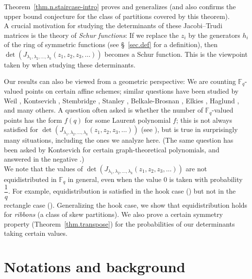 \documentclass[numbers=enddot,12pt,final,onecolumn,notitlepage]{scrartcl}%
\theoremstyle{definition}
\newcommand{\tup}[1]{\left( #1 \right)}
\newcommand{\Fq}{\mathbb{F}_q}
\theoremstyle{plainsl}
\begin{document}
Theorem~\ref{thm.n.staircase-intro} proves and generalizes \cite[Conjecture 10.1]{Anzis18} (and also confirms the upper bound conjecture \cite[Conjecture 5.10]{Anzis18} for the class of partitions covered by this theorem).
\\

A crucial motivation for studying the determinants of these Jacobi--Trudi matrices
is the theory of \emph{Schur functions}:
If we replace the $z_{i}$ by the generators $h_{i}$ of the
ring of symmetric functions (see \S~\ref{sec.def} for a definition), then
$\det\tup{J_{\lambda_1, \lambda_2, \ldots, \lambda_k}\tup{z_1, z_2, z_3, \ldots}}$
becomes a Schur function.
This is the viewpoint taken by \cite{Anzis18} when studying these determinants.

Our results can also be viewed from a geometric perspective:
We are counting $\Fq$-valued points on certain affine schemes;
similar questions have been studied by Weil \cite{Weil}, Kontsevich \cite{Kontsevich}, Stembridge \cite{Stembridge}, Stanley \cite{RPStan}, Belkale-Brosnan \cite{Belkale2003}, Elkies \cite{Elkies}, Haglund \cite{Haglund}, and many others.
A question often asked is whether the number of $\Fq$-valued points has the form $f\tup{q}$ for some Laurent polynomial $f$; this is not always satisfied for $\det\tup{J_{\lambda_1, \lambda_2, \ldots, \lambda_k}\tup{z_1, z_2, z_3, \ldots}}$ (see \cite[Proposition 5.7]{Anzis18}), but is true in surprisingly many situations, including the ones we analyze here. (The same question has been asked by Kontsevich for certain graph-theoretical polynomials, and answered in the negative \cite{Belkale2003}.)
\\

We note that the values of $\det\tup{ J_{\lambda_1, \lambda_2, \ldots, \lambda_k}\tup{z_1, z_2, z_3, \ldots} }$ are not equidistributed in $\Fq$ in general, even when the value $0$ is taken with probability $\dfrac{1}{q}$. For example, equidistribution is satisfied in the hook case (\cite[Proposition 1.2]{Anzis18}) but not in the rectangle case (\cite[Lemma 9.3]{Anzis18}). Generalizing the hook case, we show that equidistribution holds for \emph{ribbons} (a class of skew partitions).
We also prove a certain symmetry property (Theorem~\ref{thm.transpose}) for the probabilities of our determinants taking certain values.

\section{\label{sec.def}Notations and background}
\end{document}
